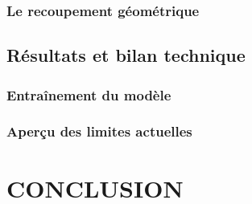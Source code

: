 \documentclass[
  11pt,
  french,
]{article}
\begin{document}
\hypertarget{le-recoupement-guxe9omuxe9trique}{%
\subsubsection{Le recoupement
géométrique}\label{le-recoupement-guxe9omuxe9trique}}

\newpage

\hypertarget{ruxe9sultats-et-bilan-technique}{%
\subsection{Résultats et bilan
technique}\label{ruxe9sultats-et-bilan-technique}}

\hypertarget{entrauxeenement-du-moduxe8le}{%
\subsubsection{Entraînement du
modèle}\label{entrauxeenement-du-moduxe8le}}

\hypertarget{aperuxe7u-des-limites-actuelles}{%
\subsubsection{Aperçu des limites
actuelles}\label{aperuxe7u-des-limites-actuelles}}

\newpage

\hypertarget{conclusion}{%
\section*{CONCLUSION}\label{conclusion}}
\end{document}

